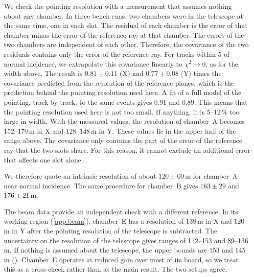 We check the pointing resolution with a measurement that assumes nothing about any chamber. In three bench runs, two
chambers were in the telescope at the same time, one in each slot. The residual of each chamber is the error of
that chamber minus the error of the reference ray at that chamber. The errors of the two chambers are independent of
each other. Therefore, the covariance of the two residuals contains only the error of the reference ray. For tracks
within 5\textdegree{} of normal incidence, we extrapolate this covariance linearly to $\chi^2\to0$, as for the width
above. The result is $0.81\pm0.11$ (X) and $0.77\pm0.08$ (Y) times the covariance predicted from the resolution of the
reference planes, which is the prediction behind the pointing resolution used here. A fit of a full model of the
pointing, track by track, to the same events gives 0.91 and 0.89. This means that the pointing resolution used here is
not too small. If anything, it is 5--12\,\% too large in width. With the measured values, the resolution of chamber~A
becomes 152--170\,\textmu m in X and 128--148\,\textmu m in Y. These values lie in the upper half of the range above.
The covariance only contains the part of the error of the reference ray that the two slots share. For this reason,
it cannot exclude an additional error that affects one slot alone.

We therefore quote an intrinsic resolution of about
$120\pm60$\,\textmu m for chamber~A near normal incidence. The same procedure for chamber~B gives $163\pm29$ and
$176\pm21$\,\textmu m.

The beam data provide an independent check with a different reference. In its working region (\cref{app:beam}),
chamber~E has a resolution of $138$\,\textmu m in X and $120$\,\textmu m in Y after the pointing resolution of the
telescope is subtracted. The uncertainty on the resolution of the telescope gives ranges of 112--153 and
89--136\,\textmu m. If nothing is assumed about the telescope, the upper bounds are 153 and 145\,\textmu m
(). Chamber~E operates at reduced gain over most of its board, so we treat this as a
cross-check rather than as the main result. The two setups agree.

